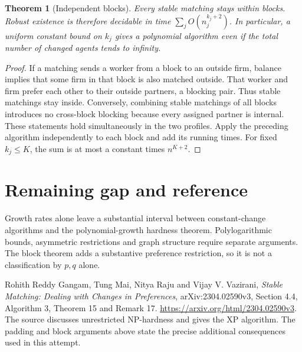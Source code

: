 \documentclass[11pt,a4paper]{article}
\newtheorem{theorem}{Theorem}[section]
\theoremstyle{definition}
\theoremstyle{remark}
\begin{document}
\begin{theorem}[Independent blocks]
Every stable matching stays within blocks. Robust existence is therefore decidable in time $\sum_j O(n_j^{k_j+2})$. In particular, a uniform constant bound on $k_j$ gives a polynomial algorithm even if the total number of changed agents tends to infinity.
\end{theorem}
\begin{proof}
If a matching sends a worker from a block to an outside firm, balance implies that some firm in that block is also matched outside. That worker and firm prefer each other to their outside partners, a blocking pair. Thus stable matchings stay inside. Conversely, combining stable matchings of all blocks introduces no cross-block blocking because every assigned partner is internal. These statements hold simultaneously in the two profiles. Apply the preceding algorithm independently to each block and add its running times. For fixed $k_j\leq K$, the sum is at most a constant times $n^{K+2}$.
\end{proof}

\section{Remaining gap and reference}
Growth rates alone leave a substantial interval between constant-change algorithms and the polynomial-growth hardness theorem. Polylogarithmic bounds, asymmetric restrictions and graph structure require separate arguments. The block theorem adds a substantive preference restriction, so it is not a classification by $p,q$ alone.

Rohith Reddy Gangam, Tung Mai, Nitya Raju and Vijay V. Vazirani, \emph{Stable Matching: Dealing with Changes in Preferences}, arXiv:2304.02590v3, Section 4.4, Algorithm 3, Theorem 15 and Remark 17. \url{https://arxiv.org/html/2304.02590v3}. The source discusses unrestricted NP-hardness and gives the XP algorithm. The padding and block arguments above state the precise additional consequences used in this attempt.
\end{document}
